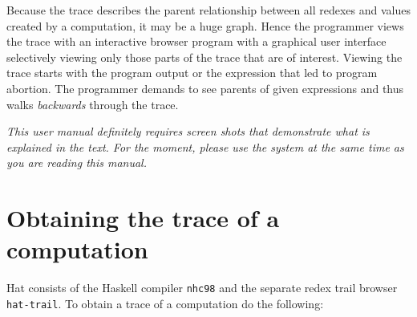 \documentclass[12pt]{article}
\begin{document}
Because the trace describes the parent relationship between all redexes and values created by a computation, it may be a huge graph. Hence the programmer views the trace with an interactive browser program with a graphical user interface selectively viewing only those parts of the trace that are of interest.
Viewing the trace starts with the program output or the expression that led to program abortion. The programmer demands to see parents of given expressions and thus walks \emph{backwards} through the trace.

\emph{This user manual definitely requires screen shots that demonstrate what is explained in the text. For the moment, please use the system at the same time as you are reading this manual.}


\section{Obtaining the trace of a computation}

Hat consists of the Haskell compiler \texttt{nhc98} and the separate
redex trail browser \texttt{hat-trail}. To obtain a trace of a
computation do the following:
\end{document}
